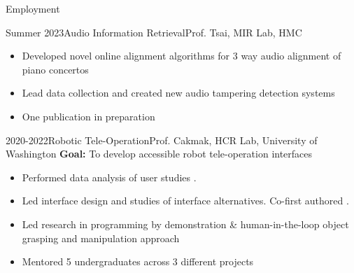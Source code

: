 \documentclass[]{mcdowellcv}
\begin{document}
\begin{cvsection}{Employment}
\begin{cvsubsection}{Summer 2023}{Audio Information Retrieval}{Prof. Tsai, MIR Lab, HMC}
\begin{itemize}
			\item Developed novel online alignment algorithms for 3 way audio alignment of piano concertos
			\item Lead data collection and created new audio tampering detection systems
			\item One publication in preparation
		\end{itemize}
	\end{cvsubsection}
	\begin{cvsubsection}{2020-2022}{Robotic Tele-Operation}{Prof. Cakmak, HCR Lab, University of Washington}
		\textbf{Goal:} To develop accessible robot tele-operation interfaces
		\begin{itemize}
			\item Performed data analysis of user studies .
			\item Led interface design and studies of interface alternatives. Co-first authored  .
			\item Led research in programming by demonstration \& human-in-the-loop object grasping and manipulation approach
			\item Mentored 5 undergraduates across 3 different projects
		\end{itemize}
	\end{cvsubsection}
\end{cvsection}
\end{document}
